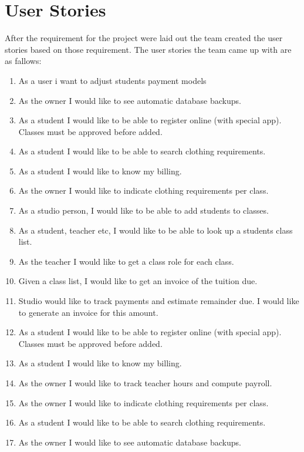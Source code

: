 \documentclass[11pt]{book}
\begin{document}
\section{User Stories}

After the requirement for the project were laid out the team created the user stories based on those requirement. The user stories the team came up with are as fallows:

\begin{enumerate}
  \item As a user i want to adjust students payment models
  \item As the owner I would like to see automatic database backups.
  \item As a student I would like to be able to register online (with special app). Classes must be approved before added.
  \item As a student I would like to be able to search clothing requirements.
  \item As a student I would like to know my billing.
  \item As the owner I would like to indicate clothing requirements per class.
  \item As a studio person, I would like to be able to add students to classes.
  \item  As a student, teacher etc, I would like to be able to look up a students class list.
  \item As the teacher I would like to get a class role for each class.
  \item Given a class list, I would like to get an invoice of the tuition due.
  \item Studio would like to track payments and estimate remainder due.  I would like to generate an invoice for this amount.
  \item As a student I would like to be able to register online (with special app).   Classes must be approved before added.
  \item As a student I would like to know my billing.
  \item As the owner I would like to track teacher hours and compute payroll.
  \item As the owner I would like to indicate clothing requirements per class.
  \item As a student I would like to be able to search clothing requirements.
  \item As the owner I would like to see automatic database backups.
\end{enumerate}
\end{document}
